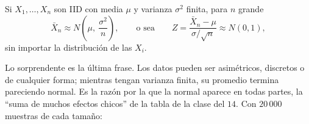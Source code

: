 \documentclass[11pt,letterpaper]{article}
\begin{document}
\begin{teorema}
    Si $X_1, \ldots, X_n$ son IID con media $\mu$ y varianza
    $\sigma^2$ finita, para $n$ grande
    \[
        \bar{X}_n \approx N\!\left( \mu,\ \frac{\sigma^2}{n} \right) ,
        \qquad \text{o sea} \qquad
        Z = \frac{\bar{X}_n - \mu}{\sigma / \sqrt{n}} \approx N(0, 1) ,
    \]
    sin importar la distribución de las $X_i$.
\end{teorema}

Lo sorprendente es la última frase. Los datos pueden ser asimétricos,
discretos o de cualquier forma; mientras tengan varianza finita, su
promedio termina pareciendo normal. Es la razón por la que la normal
aparece en todas partes, la ``suma de muchos efectos chicos'' de la
tabla de la clase del $14$. Con $20\,000$ muestras de cada tamaño:
\end{document}
